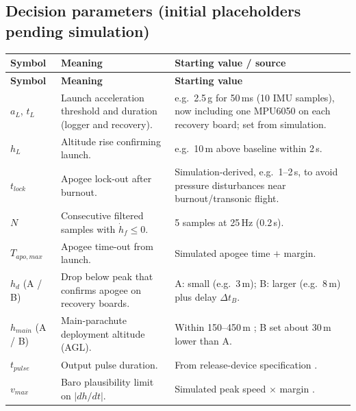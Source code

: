 \subsection{Decision parameters (initial placeholders pending simulation)}
\small
\begingroup
{}
\begin{longtable}{@{}L{22mm}L{58mm}L{66mm}@{}}
\toprule{}\textbf{Symbol}&\textbf{Meaning}&\textbf{Starting value / source}\\\midrule\endfirsthead
\toprule{}\textbf{Symbol}&\textbf{Meaning}&\textbf{Starting value}\\\midrule\endhead
\bottomrule\endlastfoot
$a_L$, $t_L$ & Launch acceleration threshold and duration (logger and recovery). & e.g.\ 2.5\,g for 50\,ms (10 IMU samples), now including one MPU6050 on each recovery board; set from simulation.\\
$h_L$ & Altitude rise confirming launch. & e.g.\ 10\,m above baseline within 2\,s.\\
$t_{lock}$ & Apogee lock-out after burnout. & Simulation-derived, e.g.\ 1--2\,s, to avoid pressure disturbances near burnout/transonic flight.\\
$N$ & Consecutive filtered samples with $\dot h_f\le0$. & 5 samples at 25\,Hz (0.2\,s).\\
$T_{apo,max}$ & Apogee time-out from launch. & Simulated apogee time $+$ margin.\\
$h_d$ (A / B) & Drop below peak that confirms apogee on recovery boards. & A: small (e.g.\ 3\,m); B: larger (e.g.\ 8\,m) plus delay $\Delta t_B$.\\
$h_{main}$ (A / B) & Main-parachute deployment altitude (AGL). & Within 150--450\,m \cite{rtc2027app03,rtc2027app08}; B set about 30\,m lower than A.\\
$t_{pulse}$ & Output pulse duration. & From release-device specification .\\
$v_{max}$ & Baro plausibility limit on $|dh/dt|$. & Simulated peak speed $\times$ margin .\\
\end{longtable}
\endgroup %
\normalsize
\label{tab:params}

